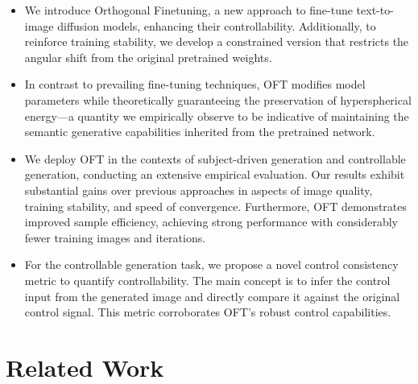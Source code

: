\begin{itemize}[leftmargin=*,nosep]

    \item We introduce Orthogonal Finetuning, a new approach to fine-tune text-to-image diffusion models, enhancing their controllability. Additionally, to reinforce training stability, we develop a constrained version that restricts the angular shift from the original pretrained weights.
    \item In contrast to prevailing fine-tuning techniques, OFT modifies model parameters while theoretically guaranteeing the preservation of hyperspherical energy—a quantity we empirically observe to be indicative of maintaining the semantic generative capabilities inherited from the pretrained network.
    \item We deploy OFT in the contexts of subject-driven generation and controllable generation, conducting an extensive empirical evaluation. Our results exhibit substantial gains over previous approaches in aspects of image quality, training stability, and speed of convergence. Furthermore, OFT demonstrates improved sample efficiency, achieving strong performance with considerably fewer training images and iterations.
    \item For the controllable generation task, we propose a novel control consistency metric to quantify controllability. The main concept is to infer the control input from the generated image and directly compare it against the original control signal. This metric corroborates OFT's robust control capabilities.
\end{itemize}

\section{Related Work}

